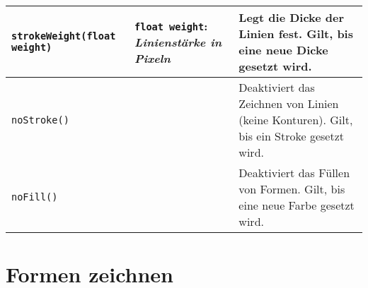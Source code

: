 \documentclass{article}
\begin{document}
\begin{longtable}{|p{}|p{}|p{}|}
\lstinline|strokeWeight(float weight)| & 
\texttt{float weight}: \textit{Linienstärke in Pixeln} & Legt die Dicke der Linien fest. Gilt, bis eine neue Dicke gesetzt wird.\\
\hline

\lstinline|noStroke()| & & Deaktiviert das Zeichnen von Linien (keine Konturen). Gilt, bis ein Stroke gesetzt wird.\\
\hline

\lstinline|noFill()| & & Deaktiviert das Füllen von Formen.  Gilt, bis eine neue Farbe gesetzt wird. \\
\hline


\end{longtable}


\section*{Formen zeichnen}
\end{document}
